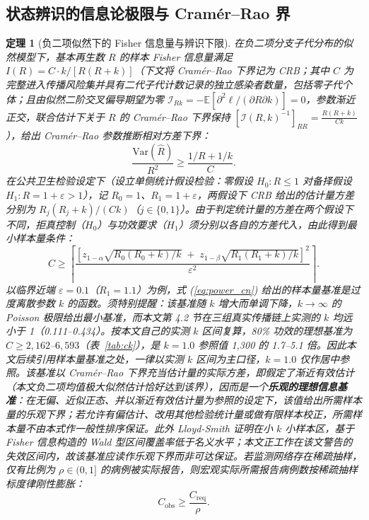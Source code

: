 \documentclass[11pt,a4paper]{article}
\theoremstyle{plain}
\newtheorem{theorem}{定理}
\theoremstyle{definition}
\begin{document}
\subsection{状态辨识的信息论极限与 Cramér--Rao 界}

\begin{theorem}[负二项似然下的 Fisher 信息量与辨识下限]\label{thm:fisher}
在负二项分支子代分布的似然模型下，基本再生数 $R$ 的样本 Fisher 信息量满足 $I(R) = C \cdot k / [R(R+k)]$（下文将 Cramér--Rao 下界记为 CRB；其中 $C$ 为完整进入传播风险集并具有二代子代计数记录的独立感染者数量，包括零子代个体；且由似然二阶交叉偏导期望为零 $\mathcal{I}_{Rk} = -\mathbb{E}[\partial^2 \ell / (\partial R \partial k)] = 0$，参数渐近正交，联合估计下关于 $R$ 的 Cramér--Rao 下界保持 $[\mathcal{I}(R,k)^{-1}]_{RR} = \frac{R(R+k)}{Ck}$），给出 Cramér--Rao 参数推断相对方差下界：
\begin{equation}
\frac{\text{Var}(\hat{R})}{R^2} \ge \frac{1/R + 1/k}{C}.
\label{eq:cramer_cn}
\end{equation}
在公共卫生检验设定下（设立单侧统计假设检验：零假设 $H_0: R \le 1$ 对备择假设 $H_1: R = 1 + \varepsilon > 1$），记 $R_0 = 1$、$R_1 = 1 + \varepsilon$，两假设下 CRB 给出的估计量方差分别为 $R_j(R_j+k)/(Ck)$（$j \in \{0,1\}$）。由于判定统计量的方差在两个假设下不同，拒真控制（$H_0$）与功效要求（$H_1$）须分别以各自的方差代入，由此得到最小样本量条件：
\begin{equation}
C \ge \left\lceil \frac{\left[z_{1-\alpha}\sqrt{R_0(R_0+k)/k} \;+\; z_{1-\beta}\sqrt{R_1(R_1+k)/k}\right]^2}{\varepsilon^2} \right\rceil .
\label{eq:power_cn}
\end{equation}
以临界近端 $\varepsilon = 0.1$（$R_1 = 1.1$）为例，式 (\ref{eq:power_cn}) 给出的样本量基准是过度离散参数 $k$ 的函数。须特别提醒：该基准随 $k$ 增大而单调下降，$k \to \infty$ 的 Poisson 极限给出最小基准，而本文第 4.2 节在三组真实传播链上实测的 $k$ 均远小于 1（0.111--0.434）。按本文自己的实测 $k$ 区间复算，80\% 功效的理想基准为 $C \ge 2{,}162$--$6{,}593$（表~\ref{tab:ck}），是 $k = 1.0$ 参照值 1,300 的 1.7--5.1 倍。因此本文后续引用样本量基准之处，一律以实测 $k$ 区间为主口径，$k=1.0$ 仅作居中参照。该基准以 Cramér--Rao 下界充当估计量的实际方差，即假定了渐近有效估计（本文负二项均值极大似然估计恰好达到该界），因而是一个\textbf{乐观的理想信息基准}：在无偏、近似正态、并以渐近有效估计量为参照的设定下，该值给出所需样本量的乐观下界；若允许有偏估计、改用其他检验统计量或做有限样本校正，所需样本量不由本式作一般性排序保证。此外 Lloyd-Smith\citep{lloyd-smith2007fisher} 证明在小 $k$ 小样本区，基于 Fisher 信息构造的 Wald 型区间覆盖率低于名义水平；本文正工作在该文警告的失效区间内，故该基准应读作乐观下界而非可达保证。若监测网络存在稀疏抽样，仅有比例为 $\rho \in (0, 1]$ 的病例被实际报告，则宏观实际所需报告病例数按稀疏抽样标度律刚性膨胀：
\begin{equation}
C_{\text{obs}} \ge \frac{C_{\text{req}}}{\rho}.
\label{eq:sparse_sampling}
\end{equation}
\end{theorem}
\end{document}
